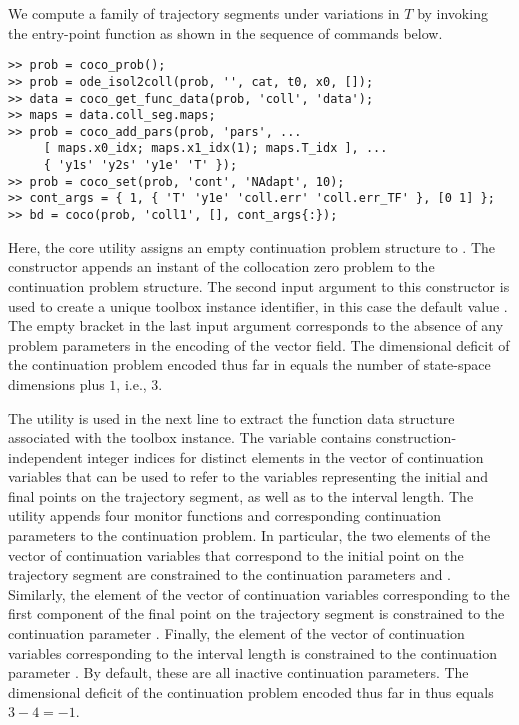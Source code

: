 We compute a family of trajectory segments under variations in $T$ by invoking the  entry-point function as shown in the sequence of commands below.
\begin{lstlisting}[language=coco-highlight]
>> prob = coco_prob();
>> prob = ode_isol2coll(prob, '', cat, t0, x0, []);
>> data = coco_get_func_data(prob, 'coll', 'data');
>> maps = data.coll_seg.maps;
>> prob = coco_add_pars(prob, 'pars', ...
     [ maps.x0_idx; maps.x1_idx(1); maps.T_idx ], ...
     { 'y1s' 'y2s' 'y1e' 'T' });
>> prob = coco_set(prob, 'cont', 'NAdapt', 10);
>> cont_args = { 1, { 'T' 'y1e' 'coll.err' 'coll.err_TF' }, [0 1] };
>> bd = coco(prob, 'coll1', [], cont_args{:});
\end{lstlisting}
Here, the  core utility assigns an empty continuation problem structure to . The  constructor appends an instant of the collocation zero problem to the continuation problem structure. The second input argument to this constructor is used to create a unique toolbox instance identifier, in this case the default value . The empty bracket in the last input argument corresponds to the absence of any problem parameters in the encoding of the vector field. The dimensional deficit of the continuation problem encoded thus far in  equals the number of state-space dimensions plus $1$, i.e., $3$.

The  utility is used in the next line to extract the function data structure associated with the  toolbox instance. The  variable contains construction-independent integer indices for distinct elements in the vector of continuation variables that  can be used to refer to the variables representing the initial and final points on the trajectory segment, as well as to the interval length. The  utility appends four monitor functions and corresponding continuation parameters to the continuation problem. In particular, the two elements of the vector of continuation variables that correspond to the initial point on the trajectory segment are constrained to the continuation parameters  and . Similarly, the element of the vector of continuation variables corresponding to the first component of the final point on the trajectory segment is constrained to the continuation parameter . Finally, the element of the vector of continuation variables corresponding to the interval length is constrained to the continuation parameter . By default, these are all inactive continuation parameters. The dimensional deficit of the continuation problem encoded thus far in  thus equals $3-4=-1$.

